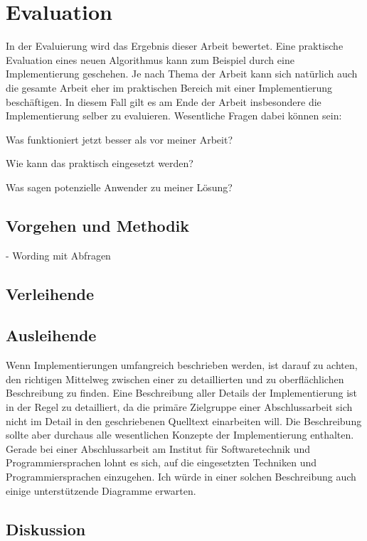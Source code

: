 
\chapter{Evaluation}
\label{chapter-evaluation}

In der Evaluierung wird das Ergebnis dieser Arbeit bewertet. Eine praktische Evaluation eines neuen Algorithmus kann zum Beispiel durch eine Implementierung geschehen. Je nach Thema der Arbeit kann sich natürlich auch die gesamte Arbeit eher im praktischen Bereich mit einer Implementierung beschäftigen. In diesem Fall gilt es am Ende der Arbeit insbesondere die Implementierung selber zu evaluieren. Wesentliche Fragen dabei können sein:
\begin{compactitem}[--]
  \item Was funktioniert jetzt besser als vor meiner Arbeit?
  \item Wie kann das praktisch eingesetzt werden?
  \item Was sagen potenzielle Anwender zu meiner Lösung?
\end{compactitem}

\section{Vorgehen und Methodik}
- Wording mit Abfragen

\section{Verleihende}

\section{Ausleihende}

Wenn Implementierungen umfangreich beschrieben werden, ist darauf zu achten, den richtigen Mittelweg zwischen einer zu detaillierten und zu oberflächlichen Beschreibung zu finden. Eine Beschreibung aller Details der Implementierung ist in der Regel zu detailliert, da die primäre Zielgruppe einer Abschlussarbeit sich nicht im Detail in den geschriebenen Quelltext einarbeiten will. Die Beschreibung sollte aber durchaus alle wesentlichen Konzepte der Implementierung enthalten. Gerade bei einer Abschlussarbeit am Institut für Softwaretechnik und Programmiersprachen lohnt es sich, auf die eingesetzten Techniken und Programmiersprachen einzugehen. Ich würde in einer solchen Beschreibung auch einige unterstützende Diagramme erwarten.


\section{Diskussion}